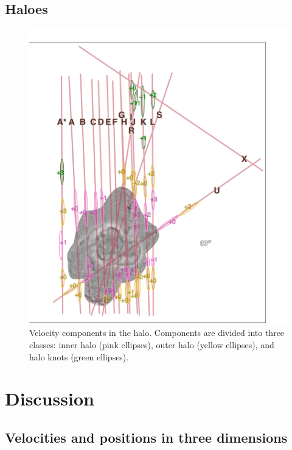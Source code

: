 \documentclass[useAMS, usenatbib]{mnras}
\begin{document}
\subsection{Haloes}
\label{sec:haloes}

\begin{figure}
  \centering
  \includegraphics[width=\linewidth]{figs/turtle-halo-map}
  \caption{
    Velocity components in the halo.
    Components are divided into three classes:
    inner halo (pink ellipses), outer halo (yellow ellipses),
    and halo knots (green ellipses).
  }
  \label{fig:halo-components}
\end{figure}


\section{Discussion}
\label{sec:discussion}

\subsection{Velocities and positions in three dimensions}
\label{sec:veloc-posit-three}
\end{document}
